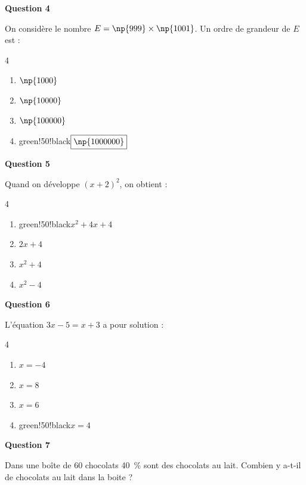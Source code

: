 \textbf{Question 4}

On considère le nombre $E = \np{999} \times \np{1001}$. Un ordre de grandeur de $E$ est :

\begin{multicols}{4}
\begin{enumerate}[label=\textbf{\alph* .}]
\item $\np{1000}$
\item $\np{10000}$
\item $\np{100000}$
\item \begin{color}{green!50!black}$\boxed{\np{1000000}}$\end{color}
\end{enumerate}
\end{multicols}

\textbf{Question 5}

Quand on développe $(x+2)^2$, on obtient :

\begin{multicols}{4}
\begin{enumerate}[label=\textbf{\alph* .}]
\item \begin{color}{green!50!black}$\boxed{x^2+4x+4}$\end{color}
\item $2x+4$
\item $x^2+4$
\item $x^2-4$
\end{enumerate}
\end{multicols}

\textbf{Question 6}

L'équation $ 3x - 5 = x + 3 $ a pour solution :

\begin{multicols}{4}
\begin{enumerate}[label=\textbf{\alph* .}]
\item $ x = -4 $
\item $ x = 8 $
\item $ x = 6 $
\item \begin{color}{green!50!black}$\boxed{ x = 4}$\end{color}
\end{enumerate}
\end{multicols}

\textbf{Question 7}

Dans une boîte de 60 chocolats 40~\% sont des chocolats au lait. Combien y a-t-il de chocolats au lait dans la boite ?

